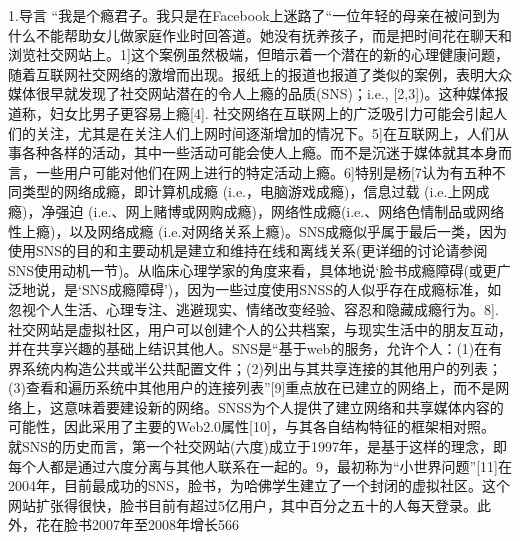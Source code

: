 
1.导言
“我是个瘾君子。我只是在Facebook上迷路了“一位年轻的母亲在被问到为什么不能帮助女儿做家庭作业时回答道。她没有抚养孩子，而是把时间花在聊天和浏览社交网站上。1]这个案例虽然极端，但暗示着一个潜在的新的心理健康问题，随着互联网社交网络的激增而出现。报纸上的报道也报道了类似的案例，表明大众媒体很早就发现了社交网站潜在的令人上瘾的品质(SNS)；i.e., [2,3])。这种媒体报道称，妇女比男子更容易上瘾[4].
社交网络在互联网上的广泛吸引力可能会引起人们的关注，尤其是在关注人们上网时间逐渐增加的情况下。5]在互联网上，人们从事各种各样的活动，其中一些活动可能会使人上瘾。而不是沉迷于媒体就其本身而言，一些用户可能对他们在网上进行的特定活动上瘾。6]特别是杨[7认为有五种不同类型的网络成瘾，即计算机成瘾 (i.e.，电脑游戏成瘾)，信息过载 (i.e.上网成瘾)，净强迫 (i.e.、网上赌博或网购成瘾)，网络性成瘾(i.e.、网络色情制品或网络性上瘾)，以及网络成瘾 (i.e.对网络关系上瘾)。SNS成瘾似乎属于最后一类，因为使用SNS的目的和主要动机是建立和维持在线和离线关系(更详细的讨论请参阅SNS使用动机一节)。从临床心理学家的角度来看，具体地说‘脸书成瘾障碍(或更广泛地说，是‘SNS成瘾障碍’)，因为一些过度使用SNSS的人似乎存在成瘾标准，如忽视个人生活、心理专注、逃避现实、情绪改变经验、容忍和隐藏成瘾行为。8].
社交网站是虚拟社区，用户可以创建个人的公共档案，与现实生活中的朋友互动，并在共享兴趣的基础上结识其他人。SNS是“基于web的服务，允许个人：(1)在有界系统内构造公共或半公共配置文件；(2)列出与其共享连接的其他用户的列表；(3)查看和遍历系统中其他用户的连接列表”[9]重点放在已建立的网络上，而不是网络上，这意味着要建设新的网络。SNSS为个人提供了建立网络和共享媒体内容的可能性，因此采用了主要的Web2.0属性[10]，与其各自结构特征的框架相对照。
就SNS的历史而言，第一个社交网站(六度)成立于1997年，是基于这样的理念，即每个人都是通过六度分离与其他人联系在一起的。9，最初称为“小世界问题”[11]在2004年，目前最成功的SNS，脸书，为哈佛学生建立了一个封闭的虚拟社区。这个网站扩张得很快，脸书目前有超过5亿用户，其中百分之五十的人每天登录。此外，花在脸书2007年至2008年增长566%
